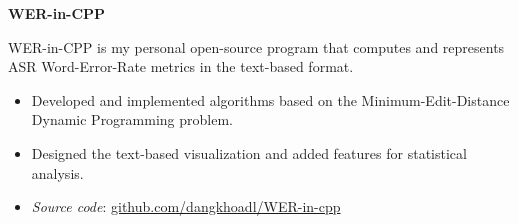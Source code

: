 \begin{multicols}{1}
    \begin{flushleft}
        \textbf{WER-in-CPP}
    \end{flushleft}
\end{multicols}

\vspace{-5mm}

\indent WER-in-CPP is my personal open-source program that computes and represents ASR Word-Error-Rate metrics in the text-based format.
\vspace{-1.5mm}
\begin{itemize}[noitemsep]
    \item Developed and implemented algorithms based on the Minimum-Edit-Distance Dynamic Programming problem.
    \item Designed the text-based visualization and added features for statistical analysis.
    \item \emph{Source code}: \href{https://github.com/dangkhoadl/WER-in-cpp}{github.com/dangkhoadl/WER-in-cpp}
\end{itemize}


